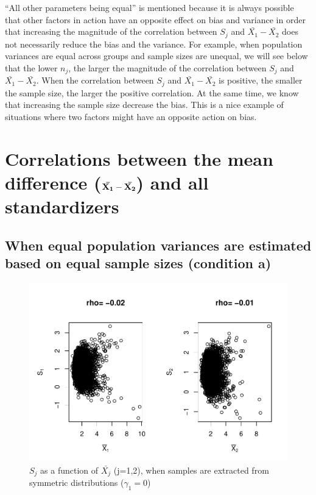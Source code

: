 \documentclass[
  english,
  man]{apa6}
\begin{document}
\enquote{All other parameters being equal} is mentioned because it is always possible that other factors in action have an opposite effect on bias and variance in order that increasing the magnitude of the correlation between \(S_j\) and \(\bar{X_1}-\bar{X_2}\) does not necessarily reduce the bias and the variance. For example, when population variances are equal across groups and sample sizes are unequal, we will see below that the lower \(n_j\), the larger the magnitude of the correlation between \(S_j\) and \(\bar{X_1}-\bar{X_2}\). When the correlation between \(S_j\) and \(\bar{X_1}-\bar{X_2}\) is positive, the smaller the sample size, the larger the positive correlation. At the same time, we know that increasing the sample size decrease the bias. This is a nice example of situations where two factors might have an opposite action on bias.

\hypertarget{correlations-between-the-mean-difference-bf-barx_1-barx_2-and-all-standardizers}{%
\section{\texorpdfstring{Correlations between the mean difference (\(\bf \bar{X_1}-\bar{X_2}\)) and all standardizers}{Correlations between the mean difference (\textbackslash bf \textbackslash bar\{X\_1\}-\textbackslash bar\{X\_2\}) and all standardizers}}\label{correlations-between-the-mean-difference-bf-barx_1-barx_2-and-all-standardizers}}

\hypertarget{when-equal-population-variances-are-estimated-based-on-equal-sample-sizes-condition-a}{%
\subsection{When equal population variances are estimated based on equal sample sizes (condition a)}\label{when-equal-population-variances-are-estimated-based-on-equal-sample-sizes-condition-a}}

\begin{figure}
\centering
\includegraphics{Correlation_files/figure-latex/pltSDMEANHombalsym-1.pdf}
\caption{\label{fig:pltSDMEANHombalsym}\(S_j\) as a function of \(\bar{X_j}\) (j=1,2), when samples are extracted from symmetric distributions (\(\gamma_1 = 0\))}
\end{figure}
\end{document}
